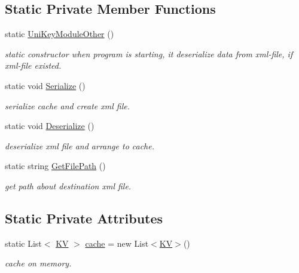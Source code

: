 \subsection*{Static Private Member Functions}
\begin{DoxyCompactItemize}
\item 
static \mbox{\hyperlink{class_siege_module_1_1_uni_key_module_other_ab7a64f84ab192cb186c60116b65d4c4b}{Uni\+Key\+Module\+Other}} ()
\begin{DoxyCompactList}\small\item\em static constructor when program is starting, it deserialize data from xml-\/file, if xml-\/file existed. \end{DoxyCompactList}\item 
static void \mbox{\hyperlink{class_siege_module_1_1_uni_key_module_other_a9edb18f38f81b27348138c8cd13ead32}{Serialize}} ()
\begin{DoxyCompactList}\small\item\em serialize cache and create xml file. \end{DoxyCompactList}\item 
static void \mbox{\hyperlink{class_siege_module_1_1_uni_key_module_other_a705e91fd483e35dee3dca4328ec1c939}{Deserialize}} ()
\begin{DoxyCompactList}\small\item\em deserialize xml file and arrange to cache. \end{DoxyCompactList}\item 
static string \mbox{\hyperlink{class_siege_module_1_1_uni_key_module_other_a5fd17dc4ef93fddb66a5d47d48fd5e0c}{Get\+File\+Path}} ()
\begin{DoxyCompactList}\small\item\em get path about destination xml file. \end{DoxyCompactList}\end{DoxyCompactItemize}
\subsection*{Static Private Attributes}
\begin{DoxyCompactItemize}
\item 
static List$<$ \mbox{\hyperlink{struct_siege_module_1_1_uni_key_module_other_1_1_k_v}{KV}} $>$ \mbox{\hyperlink{class_siege_module_1_1_uni_key_module_other_ad7b2adc7e9aae7e1bce9cda54ffd4f40}{cache}} = new List$<$\mbox{\hyperlink{struct_siege_module_1_1_uni_key_module_other_1_1_k_v}{KV}}$>$()
\begin{DoxyCompactList}\small\item\em cache on memory. \end{DoxyCompactList}\end{DoxyCompactItemize}


